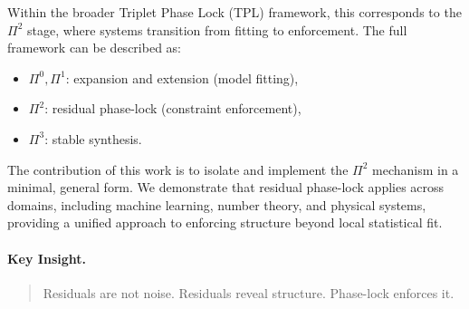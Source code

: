 Within the broader Triplet Phase Lock (TPL) framework, this corresponds to the $\Pi^2$ stage, where systems transition from fitting to enforcement. The full framework can be described as:

\begin{itemize}
\item $\Pi^0, \Pi^1$: expansion and extension (model fitting),
\item $\Pi^2$: residual phase-lock (constraint enforcement),
\item $\Pi^3$: stable synthesis.
\end{itemize}

The contribution of this work is to isolate and implement the $\Pi^2$ mechanism in a minimal, general form. We demonstrate that residual phase-lock applies across domains, including machine learning, number theory, and physical systems, providing a unified approach to enforcing structure beyond local statistical fit.

\paragraph{Key Insight.}
\begin{quote}
Residuals are not noise. Residuals reveal structure. Phase-lock enforces it.
\end{quote}
